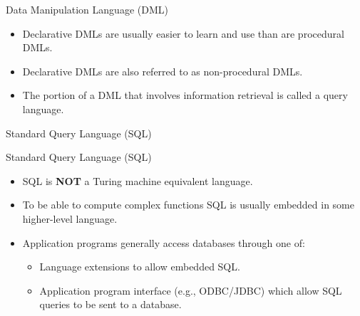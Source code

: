 \documentclass{beamer}
\begin{document}
\begin{frame}{Data Manipulation Language (DML)}
    \begin{itemize}
        \item Declarative DMLs are usually easier to learn and use than are procedural DMLs.
        \item Declarative DMLs are also referred to as non-procedural DMLs.
        \item The portion of a DML that involves information retrieval is called a query language.
    \end{itemize}
\end{frame}

\begin{frame}[fragile]{Standard Query Language (SQL)}
\end{frame}


\begin{frame}{Standard Query Language (SQL)}
    \begin{itemize}
        \item SQL is \textbf{NOT} a Turing machine equivalent language.
        \item To be able to compute complex functions SQL is usually embedded in some higher-level language.
        \item Application programs generally access databases through one of:
        \begin{itemize}
            \item Language extensions to allow embedded SQL.
            \item Application program interface (e.g., ODBC/JDBC) which allow SQL queries to be sent to a database.
        \end{itemize}
    \end{itemize}
\end{frame}
\end{document}
